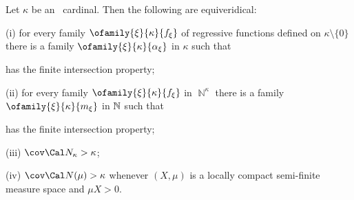  Let $\kappa$ be an \am\ cardinal.
Then the following are equiveridical:

(i) for every family $\ofamily{\xi}{\kappa}{f_{\xi}}$ of regressive
functions defined on $\kappa\setminus\{0\}$ there is a family
$\ofamily{\xi}{\kappa}{\alpha_{\xi}}$ in $\kappa$ such that


\noindent has the finite intersection property;

(ii) for every family $\ofamily{\xi}{\kappa}{f_{\xi}}$ in
$\BbbN^{\kappa}$ there is a family
$\ofamily{\xi}{\kappa}{m_{\xi}}$ in $\Bbb N$ such that


\noindent has the finite intersection property;

(iii) $\cov\Cal N_{\kappa}>\kappa$;

(iv) $\cov\Cal N(\mu)>\kappa$ whenever $(X,\mu)$ is a
locally compact semi-finite measure space and $\mu X>0$.

